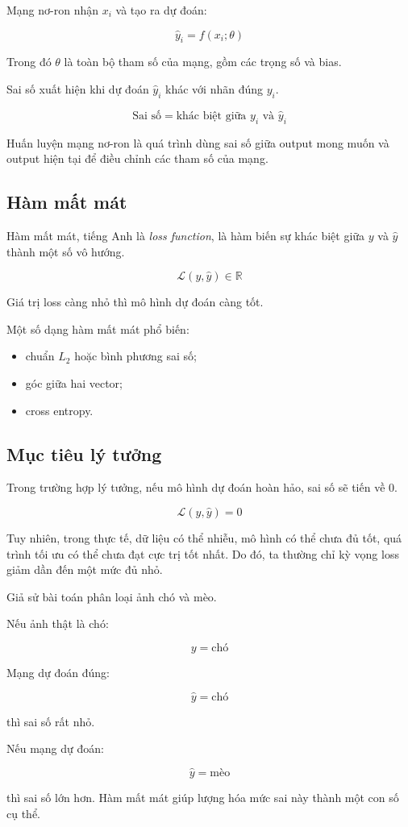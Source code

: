 Mạng nơ-ron nhận $x_i$ và tạo ra dự đoán:

\[
    \hat{y}_i = f(x_i;\theta)
\]

Trong đó $\theta$ là toàn bộ tham số của mạng, gồm các trọng số và bias.

Sai số xuất hiện khi dự đoán $\hat{y}_i$ khác với nhãn đúng $y_i$.

\[
    \text{Sai số} = \text{khác biệt giữa } y_i \text{ và } \hat{y}_i
\]

\begin{ghinho}
Huấn luyện mạng nơ-ron là quá trình dùng sai số giữa output mong muốn và output hiện tại để điều chỉnh các tham số của mạng.
\end{ghinho}

\subsection{Hàm mất mát}

Hàm mất mát, tiếng Anh là \textit{loss function}, là hàm biến sự khác biệt giữa $y$ và $\hat{y}$ thành một số vô hướng.

\[
    \mathcal{L}(y,\hat{y}) \in \mathbb{R}
\]

Giá trị loss càng nhỏ thì mô hình dự đoán càng tốt.

Một số dạng hàm mất mát phổ biến:

\begin{itemize}
    \item chuẩn $L_2$ hoặc bình phương sai số;
    \item góc giữa hai vector;
    \item cross entropy.
\end{itemize}

\subsection{Mục tiêu lý tưởng}

Trong trường hợp lý tưởng, nếu mô hình dự đoán hoàn hảo, sai số sẽ tiến về 0.

\[
    \mathcal{L}(y,\hat{y}) = 0
\]

Tuy nhiên, trong thực tế, dữ liệu có thể nhiễu, mô hình có thể chưa đủ tốt, quá trình tối ưu có thể chưa đạt cực trị tốt nhất. Do đó, ta thường chỉ kỳ vọng loss giảm dần đến một mức đủ nhỏ.

\begin{vidu}
Giả sử bài toán phân loại ảnh chó và mèo.

Nếu ảnh thật là chó:

\[
    y = \text{chó}
\]

Mạng dự đoán đúng:

\[
    \hat{y} = \text{chó}
\]

thì sai số rất nhỏ.

Nếu mạng dự đoán:

\[
    \hat{y} = \text{mèo}
\]

thì sai số lớn hơn. Hàm mất mát giúp lượng hóa mức sai này thành một con số cụ thể.
\end{vidu}

